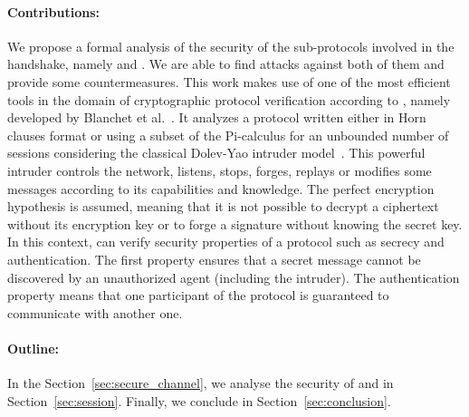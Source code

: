 \paragraph{Contributions:}

We propose a formal analysis of the security of
the sub-protocols involved in the \opcua handshake, namely \opcua
\securechan and \opcua \session.  We are able to find
attacks against both of them and provide some countermeasures.  This
work makes use of one of the most efficient tools in the domain of
cryptographic protocol verification according to \cite{LP15},
namely \proverif developed by Blanchet et al.~\cite{Bla01}.  It
analyzes a protocol written either in Horn clauses format or using a
subset of the Pi-calculus for an unbounded number of sessions
considering the classical Dolev-Yao intruder model~\cite{DY81}.  This
powerful intruder controls the network, listens, stops, forges,
replays or modifies some messages according to its capabilities and
knowledge.  The perfect encryption hypothesis is assumed, meaning that
it is not possible to decrypt a ciphertext without its encryption key
or to forge a signature without knowing the secret key.  In this
context, \proverif can verify security properties of
a protocol such as secrecy and authentication.  The first property
ensures that a secret message cannot be discovered by an unauthorized
agent (including the intruder).  The authentication property means
that one participant of the protocol is guaranteed to communicate with
another one.

\paragraph{Outline:} In the Section~\ref{sec:secure_channel}, we analyse the
security of \opcua \securechan and \opcua \session in Section~\ref{sec:session}.
Finally, we conclude in Section~\ref{sec:conclusion}.
